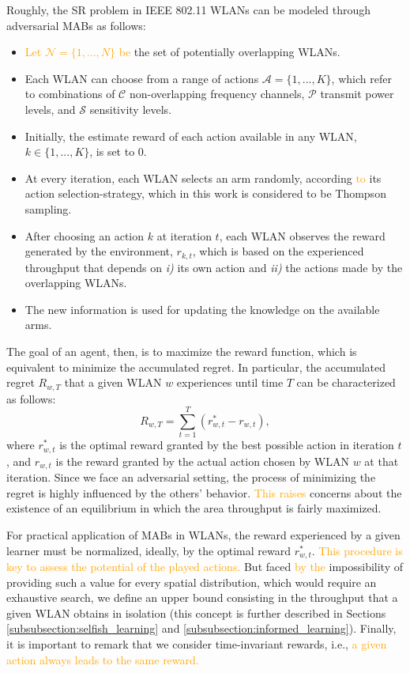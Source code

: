 \documentclass[preprint,12pt]{elsarticle}
\begin{document}
Roughly, the SR problem in IEEE 802.11 WLANs can be modeled through adversarial MABs as follows:	
\begin{itemize}
	\item \textcolor{orange}{Let $\mathcal{N} = \{1,..., N\}$ be} the set of potentially overlapping WLANs.
	\item Each WLAN can choose from a range of actions $\mathcal{A} = \{1,..., K\}$, which refer to combinations of $\mathcal{C}$ non-overlapping frequency channels, $\mathcal{P}$ transmit power levels, and $\mathcal{S}$ sensitivity levels.
	\item Initially, the estimate reward of each action available in any WLAN, $k \in \{1,...,K\}$, is set to 0.
	\item At every iteration, each WLAN selects an arm randomly, according \textcolor{orange}{to} its action selection-strategy, which in this work is considered to be Thompson sampling.
	\item After choosing an action $k$ at iteration $t$, each WLAN observes the reward generated by the environment, $r_{k,t}$, which is based on the experienced throughput that depends on \emph{i)} its own action and \emph{ii)} the actions made by the overlapping WLANs.
	\item The new information is used for updating the knowledge on the available arms.
\end{itemize}

The goal of an agent, then, is to maximize the reward function, which is equivalent to minimize the accumulated regret. In particular, the accumulated regret $R_{w,T}$ that a given WLAN $w$ experiences until time $T$ can be characterized as follows:
\begin{equation}
R_{w,T} = \sum_{t = 1}^{T} (r_{w,t}^* - r_{w,t}),
\nonumber
\end{equation}
where $r_{w,t}^*$ is the optimal reward granted by the best possible action in iteration $t$, and $r_{w,t}$ is the reward granted by the actual action chosen by WLAN $w$ at that iteration. Since we face an adversarial setting, the process of minimizing the regret is highly influenced by the others' behavior. \textcolor{orange}{This raises} concerns about the existence of an equilibrium in which the area throughput is fairly maximized. 

For practical application of MABs in WLANs, the reward experienced by a given learner must be normalized, ideally, by the optimal reward $r_{w,t}^*$. \textcolor{orange}{This procedure is key to assess the potential of the played actions.} But faced \textcolor{orange}{by the} impossibility of providing such a value for every spatial distribution, which would require an exhaustive search, we define an upper bound consisting in the throughput that a given WLAN obtains in isolation (this concept is further described in Sections \ref{subsubsection:selfish_learning} and \ref{subsubsection:informed_learning}). Finally, it is important to remark that we consider time-invariant rewards, i.e., \textcolor{orange}{a given action  always leads to the same reward.}
\end{document}
